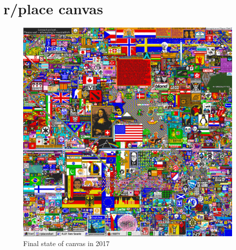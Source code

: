\clearpage

\section{r/place canvas}
\label{placeAppendix}


\begin{figure}[h!]
    \centering
    \includegraphics[width=\textwidth]{images/final_2017_place}
    \caption{Final state of canvas in 2017}
    \label{fig:place2017}
\end{figure}
